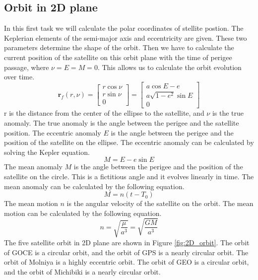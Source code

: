 \documentclass[12pt
,headinclude
,headsepline
,bibtotocnumbered
]{scrartcl}
\begin{document}
\subsection*{Orbit in 2D plane}
In this first task we will calculate the polar coordinates of stellite postion. The Keplerian elements of the semi-major axis and eccentricity are given. These two parameters determine the shape of the orbit. Then we have to calculate the current position of the satellite on this orbit plane with the time of perigee passage, where $\nu=E=M=0$. This allows us to calculate the orbit evolution over time. 
\begin{equation*}
    \boldsymbol{r}_f(r,\nu)=\begin{bmatrix}
        r\cos\nu\\
        r\sin\nu\\
        0
    \end{bmatrix}
    =\begin{bmatrix}
        a\cos E-e\\
        a\sqrt{1-e^2}\sin E\\
        0
    \end{bmatrix}
\end{equation*}
r is the distance from the center of the ellipse to the satellite, and $\nu$ is the true anomaly. The true anomaly is the angle between the perigee and the satellite position. The eccentric anomaly $E$ is the angle between the perigee and the position of the satellite on the ellipse. The eccentric anomaly can be calculated by solving the Kepler equation.
\begin{equation*}
    M=E-e\sin E
\end{equation*}
The mean anomaly $M$ is the angle between the perigee and the position of the satellite on the circle. This is a fictitious angle and it evolves linearly in time. The mean anomaly can be calculated by the following equation.
\begin{equation*}
    M=n(t-T_0)
\end{equation*}
The mean motion $n$ is the angular velocity of the satellite on the orbit. The mean motion can be calculated by the following equation.
\begin{equation*}
    n=\sqrt{\frac{\mu}{a^3}}=\sqrt{\frac{GM}{a^3}}
\end{equation*}
The five satellite orbit in 2D plane are shown in Figure \ref{fig:2D_orbit}. The orbit of GOCE is a circular orbit, and the orbit of GPS is a nearly circular orbit. The orbit of Molniya is a highly eccentric orbit. The orbit of GEO is a circular orbit, and the orbit of Michibiki is a nearly circular orbit.
\end{document}
